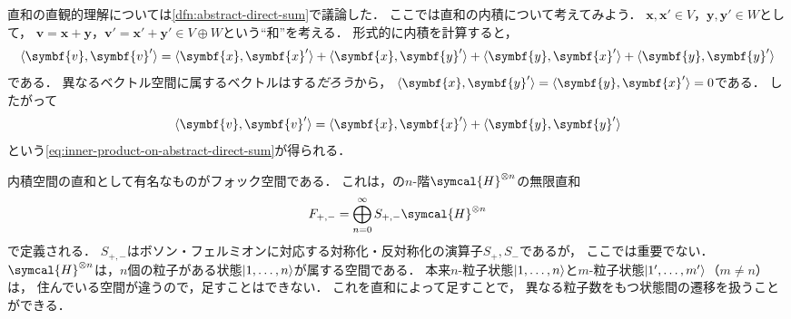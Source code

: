\documentclass[../sotsu.tex]{subfiles}
\begin{document}
直和の直観的理解については\cref{dfn:abstract-direct-sum}で議論した．
ここでは直和の内積について考えてみよう．
$\symbf{x}, \symbf{x}' \in V$，$\symbf{y}, \symbf{y}' \in W$として，
$\symbf{v} = \symbf{x} + \symbf{y}$，$\symbf{v}' = \symbf{x}' + \symbf{y}' \in V \oplus W$という``和''を考える．
形式的に内積を計算すると，
\begin{equation*}
    \iparen{ \symbf{v}, \symbf{v}' }
        = \iparen{ \symbf{x}, \symbf{x}' }
        + \iparen{ \symbf{x}, \symbf{y}' }
        + \iparen{ \symbf{y}, \symbf{x}' }
        + \iparen{ \symbf{y}, \symbf{y}' }
\end{equation*}
である．
異なるベクトル空間に属するベクトルはする\emph{だろう}から，
$\iparen{\symbf{x}, \symbf{y}'} = \iparen{\symbf{y}, \symbf{x}'} = 0$である．
したがって
\begin{equation*}
    \iparen{ \symbf{v}, \symbf{v}' }
        = \iparen{ \symbf{x}, \symbf{x}' }
        + \iparen{ \symbf{y}, \symbf{y}' }
\end{equation*}
という\cref{eq:inner-product-on-abstract-direct-sum}が得られる．

内積空間の直和として有名なものがフォック空間である．
これは，の$n$-階$\symcal{H}^{\otimes n}$の無限直和
\begin{equation*}
    F_{+,-} = \bigoplus_{n = 0}^{\infty} S_{+,-} \symcal{H}^{\otimes n}
\end{equation*}
で定義される．
$S_{+,-}$はボソン・フェルミオンに対応する対称化・反対称化の演算子$S_+, S_-$であるが，
ここでは重要でない．
$\symcal{H}^{\otimes n}$は，$n$個の粒子がある状態$\lvert1, \dots, n\rangle$が属する空間である．
本来$n$-粒子状態$\lvert1, \dots, n\rangle$と$m$-粒子状態$\lvert1', \dots, m'\rangle$（$m \neq n$）は，
住んでいる空間が違うので，足すことはできない．
これを直和によって足すことで，
異なる粒子数をもつ状態間の遷移を扱うことができる．
\end{document}
